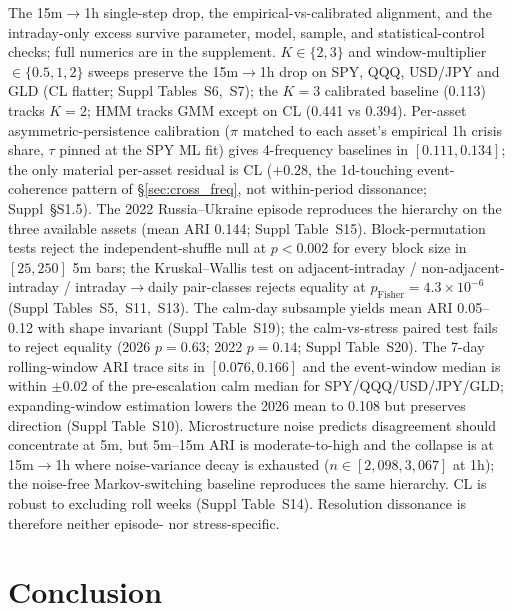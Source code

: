 \documentclass[preprint,12pt,authoryear]{elsarticle}
\newcommand{\CL}{CL}
\begin{document}
The 15m$\to$1h single-step drop, the empirical-vs-calibrated alignment, and the intraday-only excess survive parameter, model, sample, and statistical-control checks; full numerics are in the supplement. $K\in\{2,3\}$ and window-multiplier $\in\{0.5,1,2\}$ sweeps preserve the 15m$\to$1h drop on SPY, QQQ, USD/JPY and GLD (CL flatter; Suppl Tables~S6,~S7); the $K{=}3$ calibrated baseline (0.113) tracks $K{=}2$; HMM tracks GMM except on CL (0.441 vs 0.394). Per-asset asymmetric-persistence calibration ($\pi$ matched to each asset's empirical 1h crisis share, $\tau$ pinned at the SPY ML fit) gives 4-frequency baselines in $[0.111, 0.134]$; the only material per-asset residual is CL ($+0.28$, the 1d-touching event-coherence pattern of \S\ref{sec:cross_freq}, not within-period dissonance; Suppl~\S{}S1.5). The 2022 Russia--Ukraine episode reproduces the hierarchy on the three available assets (mean ARI 0.144; Suppl Table~S15). Block-permutation tests reject the independent-shuffle null at $p<0.002$ for every block size in $[25, 250]$ 5m bars; the Kruskal--Wallis test on adjacent-intraday / non-adjacent-intraday / intraday$\to$daily pair-classes rejects equality at $p_{\text{Fisher}}=4.3{\times}10^{-6}$ (Suppl Tables~S5,~S11,~S13). The calm-day subsample yields mean ARI 0.05--0.12 with shape invariant (Suppl Table~S19); the calm-vs-stress paired test fails to reject equality (2026 $p=0.63$; 2022 $p=0.14$; Suppl Table~S20). The 7-day rolling-window ARI trace sits in $[0.076, 0.166]$ and the event-window median is within $\pm 0.02$ of the pre-escalation calm median for SPY/QQQ/USD/JPY/GLD; expanding-window estimation lowers the 2026 mean to 0.108 but preserves direction (Suppl Table~S10). Microstructure noise \citep{GencaySelcukWhitcher2001,AitSahaliaMykland2005} predicts disagreement should concentrate at 5m, but 5m--15m ARI is moderate-to-high and the collapse is at 15m$\to$1h where noise-variance decay is exhausted ($n\in[2{,}098, 3{,}067]$ at 1h); the noise-free Markov-switching baseline reproduces the same hierarchy. \CL{} is robust to excluding roll weeks (Suppl Table~S14). Resolution dissonance is therefore neither episode- nor stress-specific.

\section{Conclusion}\label{sec:conclusion}
\end{document}
